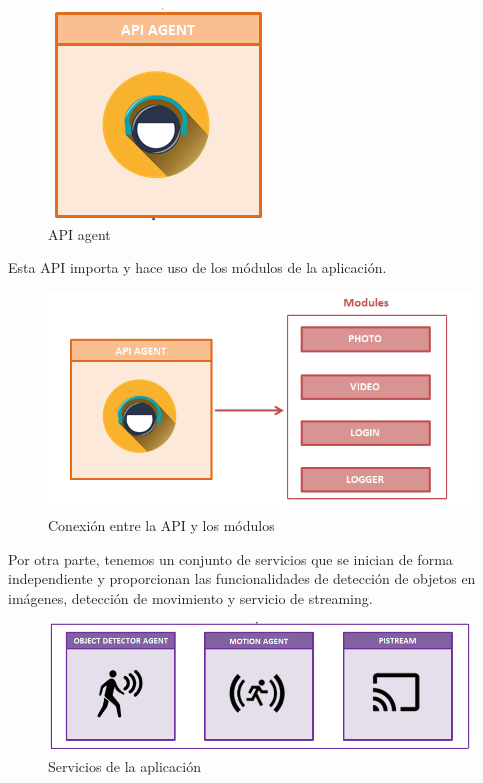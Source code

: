 \begin{figure}[h]
	\centering
	\includegraphics[scale=0.35]{images/25}
	\caption{API agent}
	\label{img:api}
\end{figure}

\newpage

Esta API importa y hace uso de los módulos de la aplicación. 

\begin{figure}[h]
	\centering
	\includegraphics[scale=0.35]{images/27}
	\caption{Conexión entre la API y los módulos}
	\label{img:conexionapimodulos}
\end{figure}

Por otra parte, tenemos un conjunto de servicios que se inician de forma independiente y proporcionan las funcionalidades de detección de objetos en imágenes, detección de movimiento y servicio de streaming.

\begin{figure}[h]
	\centering
	\includegraphics[scale=0.35]{images/26}
	\caption{Servicios de la aplicación}
	\label{img:serviciosaplicacion}
\end{figure}

